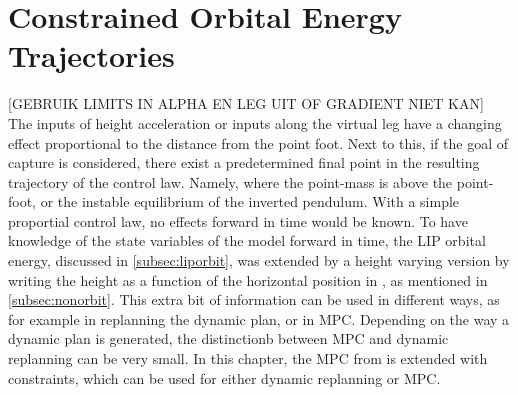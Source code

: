 %
\chapter{Constrained Orbital Energy Trajectories}
[GEBRUIK LIMITS IN ALPHA EN LEG UIT OF GRADIENT NIET KAN] The inputs of height acceleration or inputs along the virtual leg have a changing effect proportional to the distance from the point foot. Next to this, if the goal of capture is considered, there exist a predetermined final point in the resulting trajectory of the control law. Namely, where the point-mass is above the point-foot, or the instable equilibrium of the inverted pendulum. With a simple proportial control law, no effects forward in time would be known. To have knowledge of the state variables of the model forward in time, the \ac{LIP} orbital energy, discussed in \ref{subsec:liporbit}, was extended by a height varying version by writing the height as a function of the horizontal position in  \cite{pratt2007derivation}, as mentioned in \ref{subsec:nonorbit}. This extra bit of information can be used in different ways, as for example in replanning the dynamic plan, or in \ac{MPC}. Depending on the way a dynamic plan is generated, the distinctionb between \ac{MPC} and dynamic replanning can be very small. In this chapter, the \ac{MPC} from \cite{koolen2016balance} is extended with constraints, which can be used for either dynamic replanning or \ac{MPC}.


